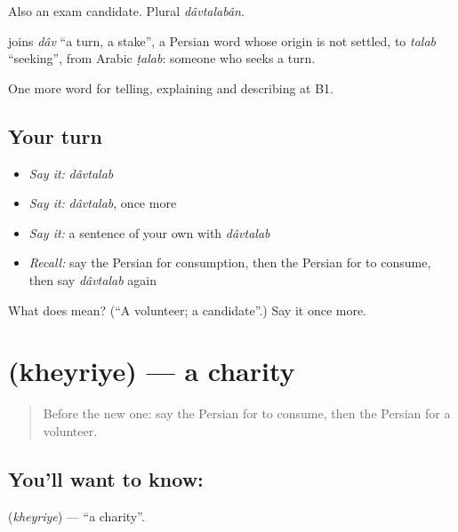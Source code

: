 Also an exam candidate. Plural \emph{dâvtalabân}.

\begin{cousinweb}
\textbf{} joins \emph{dâv} \textquotedblleft{}a turn, a stake\textquotedblright{}, a Persian word whose origin is not settled, to \emph{talab} \textquotedblleft{}seeking\textquotedblright{}, from Arabic \emph{ṭalab}: someone who seeks a turn.
\end{cousinweb}

\begin{grammarlens}[title={What you've built}]
One more word for telling, explaining and describing at B1.
\end{grammarlens}

\subsection*{Your turn}
\begin{itemize}
\raggedright
  \item \emph{Say it:} \emph{dâvtalab}
  \item \emph{Say it:} \emph{dâvtalab}, once more
  \item \emph{Say it:} a sentence of your own with \emph{dâvtalab}
  \item \emph{Recall:} say the Persian for consumption, then the Persian for to consume, then say \emph{dâvtalab} again
\end{itemize}

\begin{tcolorbox}[breakable,colback=teal!4,colframe=teal!35!black,title={Before you move on}]
What does  mean? (\textquotedblleft{}A volunteer; a candidate\textquotedblright{}.) Say it once more.
\end{tcolorbox}
\section[\texorpdfstring{\fa{خیریه} (kheyriye)}{خیریه (kheyriye)}]{ (kheyriye) — a charity}

\label{lesson:FA-C389-kheyriyye}



\begin{quote}
Before the new one: say the Persian for to consume, then the Persian for a volunteer.
\end{quote}

\subsection*{You'll want to know: }
\textbf{} (\emph{kheyriye}) — \textquotedblleft{}a charity\textquotedblright{}.

